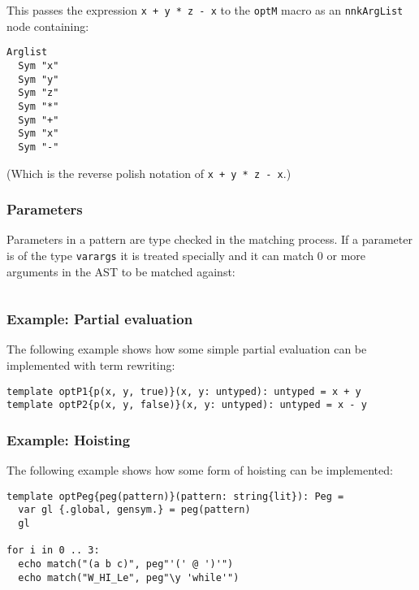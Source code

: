 This passes the expression \texttt{x\ +\ y\ *\ z\ -\ x} to the
\texttt{optM} macro as an \texttt{nnkArgList} node containing:

\begin{verbatim}
Arglist
  Sym "x"
  Sym "y"
  Sym "z"
  Sym "*"
  Sym "+"
  Sym "x"
  Sym "-"
\end{verbatim}

(Which is the reverse polish notation of \texttt{x\ +\ y\ *\ z\ -\ x}.)

\hypertarget{parameters}{%
\subsubsection{Parameters}\label{parameters}}

Parameters in a pattern are type checked in the matching process. If a
parameter is of the type \texttt{varargs} it is treated specially and it
can match 0 or more arguments in the AST to be matched against:

\begin{verbatim}
\end{verbatim}

\hypertarget{example-partial-evaluation}{%
\subsubsection{Example: Partial
evaluation}\label{example-partial-evaluation}}

The following example shows how some simple partial evaluation can be
implemented with term rewriting:

\begin{verbatim}
template optP1{p(x, y, true)}(x, y: untyped): untyped = x + y
template optP2{p(x, y, false)}(x, y: untyped): untyped = x - y
\end{verbatim}

\hypertarget{example-hoisting}{%
\subsubsection{Example: Hoisting}\label{example-hoisting}}

The following example shows how some form of hoisting can be
implemented:

\begin{verbatim}
template optPeg{peg(pattern)}(pattern: string{lit}): Peg =
  var gl {.global, gensym.} = peg(pattern)
  gl

for i in 0 .. 3:
  echo match("(a b c)", peg"'(' @ ')'")
  echo match("W_HI_Le", peg"\y 'while'")
\end{verbatim}

